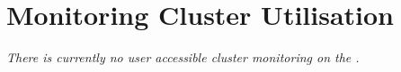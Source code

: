 \chapter{Monitoring Cluster Utilisation}
\label{ch:monitoring-cluster-utilization}

\textit{There is currently no user accessible cluster monitoring on the \hpc.}
